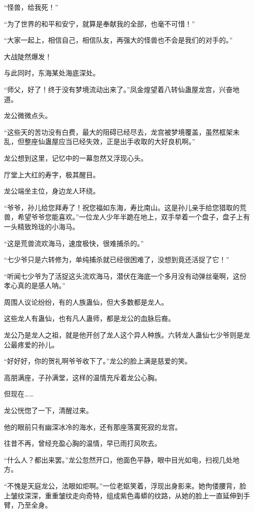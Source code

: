 \begin{this_body}
“怪兽，给我死！”

“为了世界的和平和安宁，就算是奉献我的全部，也毫不可惜！”

“大家一起上，相信自己，相信队友，再强大的怪兽也不会是我们的对手的。”

大战陡然爆发！

与此同时，东海某处海底深处。

“师父，好了！终于没有梦境流动出来了。”凤金煌望着八转仙蛊屋龙宫，兴奋地道。

龙公微微点头。

“这些天的苦功没有白费，最大的阻碍已经尽去，龙宫被梦境覆盖，虽然框架未乱，但整座仙蛊屋应当已经失效，正是出手收取的大好良机啊。”

龙公想到这里，记忆中的一幕忽然又浮现心头。

厅堂上大红的寿字，极其醒目。

龙公端坐主位，身边龙人环绕。

“爷爷，孙儿给您拜寿了！祝您福如东海，寿比南山。这是孙儿亲手给您猎取的荒兽，希望爷爷您能喜欢。”一位龙人少年半跪在地上，双手举着一个盘子，盘子上有一头精致玲珑的小海马。

“这是荒兽流欢海马，速度极快，很难捕杀的。”

“七少爷只是六转修为，单纯捕杀就已经很困难了，没想到竟还活捉了它！”

“听闻七少爷为了活捉这头流欢海马，潜伏在海底一个多月没有动弹丝毫啊，这份孝心真的是感人呐。”

周围人议论纷纷，有的人族蛊仙，但大多数都是龙人。

这些龙人有蛊仙，也有凡人蛊师，都是龙公的血脉后裔。

龙公乃是龙人之祖，就是他开创了龙人这个异人种族。六转龙人蛊仙七少爷则是龙公最疼爱的孙儿。

“好好好，你的贺礼啊爷爷收下了。”龙公的脸上满是慈爱的笑。

高朋满座，子孙满堂，这样的温情充斥着龙公心胸。

但现在……

龙公恍惚了一下，清醒过来。

他的眼前只有幽深冰冷的海水，还有那座落寞死寂的龙宫。

往昔不再，曾经充盈心胸的温情，早已雨打风吹去。

“什么人？都出来罢。”龙公忽然开口，他面色平静，眼中目光如电，扫视几处地方。

“不愧是天庭龙公，法眼如炬啊。”一位老妪笑着，浮现出身影来。她佝偻腰背，脸上皱纹深深，重重皱纹走向奇特，组成紫色毒蟒的纹路，从她的脸上一直延伸到手臂，乃至全身。


\end{this_body}
